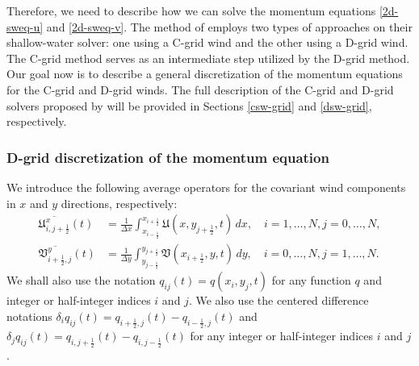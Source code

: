 Therefore, we need to describe how we can solve the momentum equations \eqref{2d-sweq-u} and \eqref{2d-sweq-v}. 
The method of \citet{lin:1997} employs two types of approaches on their shallow-water solver: one using a C-grid wind and the other using a D-grid wind.
The C-grid method serves as an intermediate step utilized by the D-grid method.
Our goal now is to describe a general discretization of the momentum equations for the C-grid and D-grid winds.
The full description of the C-grid and D-grid solvers proposed by 
\citet{lin:1997} will be provided in Sections \ref{csw-grid} and \ref{dsw-grid}, respectively.

\subsubsection{D-grid discretization of the momentum equation }
We introduce the following average operators for the covariant wind components in $x$ and $y$ directions, respectively:
\begin{align}
	\label{2d-sweq-int_u}
	\overline{\mathfrak{U}^x_{i,j+\frac{1}{2}}}(t)&= \frac{1}{\Delta x} \int_{x_{i-\frac{1}{2}}}^{x_{i+\frac{1}{2}}} \mathfrak{U}(x, y_{j+\frac{1}{2}}, t) \,dx , \quad i=1,\ldots,N,j=0,\ldots, N,\\
	\label{2d-sweq-int_v}
	\overline{\mathfrak{V}^y_{i+\frac{1}{2},j}}(t)&= \frac{1}{\Delta y} \int_{y_{j-\frac{1}{2}}}^{y_{j+\frac{1}{2}}} \mathfrak{V}(x_{i+\frac{1}{2}}, y, t) \,dy,  \quad i=0,\ldots,N,j=1,\ldots, N.
\end{align}
We shall also use the notation $q_{ij}(t) = q(x_i,y_j,t)$ for any function $q$ and integer or half-integer indices $i$ and $j$.
We also use the centered difference notations $\delta _i q_{ij}(t) =q_{i+\frac{1}{2},j}(t) -q_{i-\frac{1}{2},j}(t)$ and 
$\delta _j q_{ij}(t) = q_{i,j+\frac{1}{2}}(t) -q_{i,j-\frac{1}{2}}(t)$ for any integer or half-integer indices $i$ and $j$.

